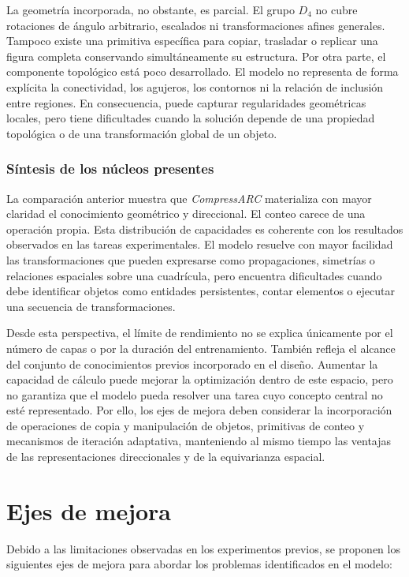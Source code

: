 \documentclass[11pt,a4paper,spanish]{book}
\numberwithin{equation}{chapter}
\numberwithin{figure}{chapter}
\begin{document}
La geometría incorporada, no obstante, es parcial. El grupo $D_4$ no cubre rotaciones de ángulo arbitrario, escalados ni
transformaciones afines generales. Tampoco existe una primitiva específica para copiar, trasladar o replicar una figura completa
conservando simultáneamente su estructura. Por otra parte, el componente topológico está poco desarrollado. El modelo no representa
de forma explícita la conectividad, los agujeros, los contornos ni la relación de inclusión entre regiones. En consecuencia, puede
capturar regularidades geométricas locales, pero tiene dificultades cuando la solución depende de una propiedad topológica o de una
transformación global de un objeto.

\subsubsection{Síntesis de los núcleos presentes}

La comparación anterior muestra que \textit{CompressARC} materializa con mayor claridad el conocimiento geométrico y direccional. El conteo carece de una
operación propia. Esta distribución de capacidades es coherente con los resultados observados en las tareas experimentales. El modelo
resuelve con mayor facilidad las transformaciones que pueden expresarse como propagaciones, simetrías o relaciones espaciales sobre
una cuadrícula, pero encuentra dificultades cuando debe identificar objetos como entidades persistentes, contar elementos o ejecutar
una secuencia de transformaciones.

Desde esta perspectiva, el límite de rendimiento no se explica únicamente por el número de capas o por la duración del entrenamiento.
También refleja el alcance del conjunto de conocimientos previos incorporado en el diseño. Aumentar la capacidad de cálculo puede
mejorar la optimización dentro de este espacio, pero no garantiza que el modelo pueda resolver una tarea cuyo concepto central no
esté representado. Por ello, los ejes de mejora deben considerar la incorporación de operaciones de copia y manipulación de objetos,
primitivas de conteo y mecanismos de iteración adaptativa, manteniendo al mismo tiempo las ventajas de las representaciones
direccionales y de la equivarianza espacial.

\section{Ejes de mejora}

Debido a las limitaciones observadas en los experimentos previos, se proponen los siguientes ejes de mejora para abordar los problemas identificados en el modelo:
\end{document}
